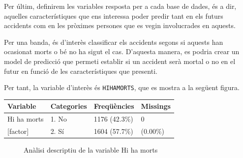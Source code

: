 \documentclass[11pt,longbibliography]{article}
\theoremstyle{definition}
\theoremstyle{remark}
\begin{document}
Per últim, definirem les variables resposta per a cada base de dades, és a dir, aquelles característiques que ens interessa poder predir tant en els futurs accidents com en les pròximes persones que es vegin involucrades en aquests.


Per una banda, és d'interès classificar els accidents segons si aquests han ocasionat morts o bé no ha sigut el cas. D'aquesta manera, es podria crear un model de predicció que permeti establir si un accident serà mortal o no en el futur en funció de les característiques que presenti.


Per tant, la variable d'interès és \texttt{HIHAMORTS}, que es mostra a la següent figura.

\begin{table}[H]
\centering
\begin{tabular}{llll}
\hline
Variable         & Categories  & Freqüències   & Missings \\ \hline
Hi ha morts & 1. No & 1176 (42.3\%) & 0        \\
{[}factor{]}     & 2. Sí      & 1604 (57.7\%) & (0.00\%) \\ \hline
\end{tabular}
\end{table}

\begin{figure}[h!]
\par
{}%
\hfill
{}%
\par

\caption{Anàlisi descriptiu de la variable Hi ha morts}
\label{fig:F3}
\end{figure}
\end{document}
